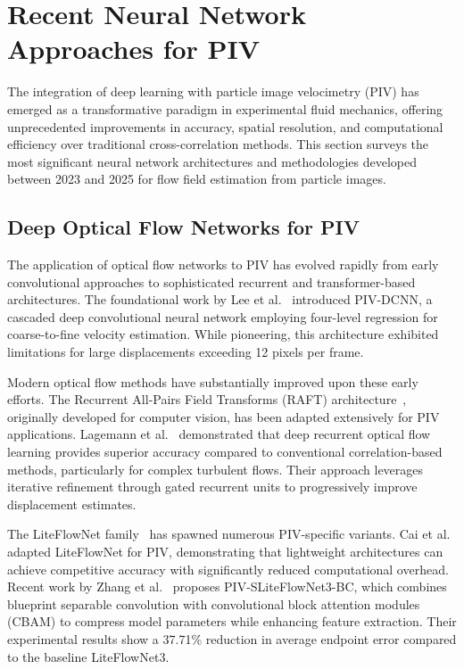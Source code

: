 \section{Recent Neural Network Approaches for PIV}
\label{sec:neural_piv}

The integration of deep learning with particle image velocimetry (PIV) has emerged as a transformative paradigm in experimental fluid mechanics, offering unprecedented improvements in accuracy, spatial resolution, and computational efficiency over traditional cross-correlation methods. This section surveys the most significant neural network architectures and methodologies developed between 2023 and 2025 for flow field estimation from particle images.

\subsection{Deep Optical Flow Networks for PIV}

The application of optical flow networks to PIV has evolved rapidly from early convolutional approaches to sophisticated recurrent and transformer-based architectures. The foundational work by Lee et al.~\cite{lee2017piv_dcnn} introduced PIV-DCNN, a cascaded deep convolutional neural network employing four-level regression for coarse-to-fine velocity estimation. While pioneering, this architecture exhibited limitations for large displacements exceeding 12 pixels per frame.

Modern optical flow methods have substantially improved upon these early efforts. The Recurrent All-Pairs Field Transforms (RAFT) architecture~\cite{teed2020raft}, originally developed for computer vision, has been adapted extensively for PIV applications. Lagemann et al.~\cite{lagemann2021deep_recurrent} demonstrated that deep recurrent optical flow learning provides superior accuracy compared to conventional correlation-based methods, particularly for complex turbulent flows. Their approach leverages iterative refinement through gated recurrent units to progressively improve displacement estimates.

The LiteFlowNet family~\cite{hui2018liteflownet} has spawned numerous PIV-specific variants. Cai et al.~\cite{cai2019piv_liteflownet} adapted LiteFlowNet for PIV, demonstrating that lightweight architectures can achieve competitive accuracy with significantly reduced computational overhead. Recent work by Zhang et al.~\cite{zhang2024lightweight} proposes PIV-SLiteFlowNet3-BC, which combines blueprint separable convolution with convolutional block attention modules (CBAM) to compress model parameters while enhancing feature extraction. Their experimental results show a 37.71\% reduction in average endpoint error compared to the baseline LiteFlowNet3.

